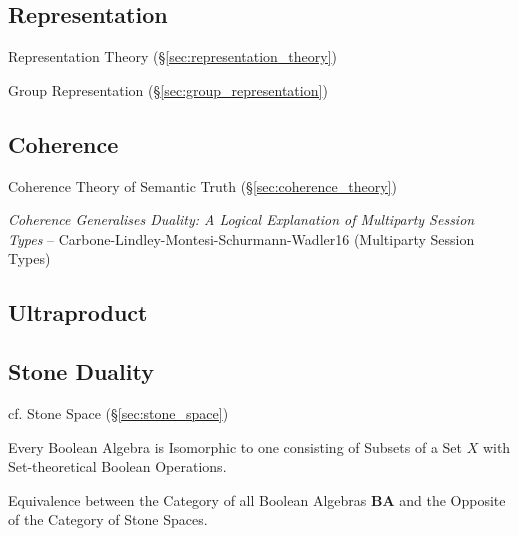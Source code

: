\subsection{Representation}\label{sec:model_representation}

Representation Theory (\S\ref{sec:representation_theory})

Group Representation (\S\ref{sec:group_representation})




\subsection{Coherence}\label{sec:coherence}

\fist Coherence Theory of Semantic Truth
(\S\ref{sec:coherence_theory})

\emph{Coherence Generalises Duality: A Logical Explanation of
  Multiparty Session Types} --
Carbone-Lindley-Montesi-Schurmann-Wadler16 (Multiparty Session Types)



\subsection{Ultraproduct}\label{sec:ultraproducts}

\subsection{Stone Duality}\label{sec:stone_duality}

\fist cf. Stone Space (\S\ref{sec:stone_space})

Every Boolean Algebra is Isomorphic to one consisting of Subsets of a
Set $X$ with Set-theoretical Boolean Operations.

Equivalence between the Category of all Boolean Algebras $\mathbf{BA}$
and the Opposite of the Category of Stone Spaces.

